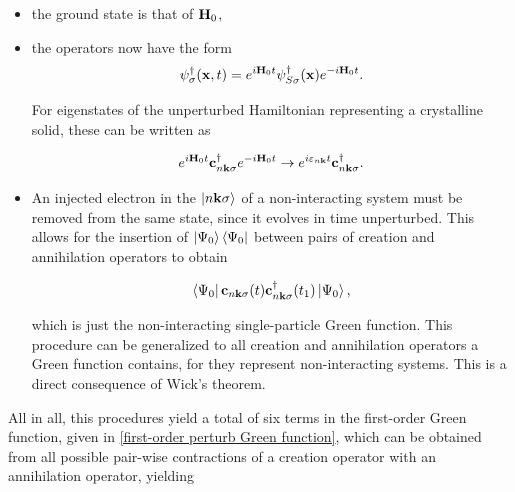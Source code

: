 \documentclass{homework}
\begin{document}
\begin{itemize}
    \item the ground state is that of ${\bf H}_0$, 
    \item the operators now have the form
          $$
            \psi_\sigma^\dagger({\bf x},t) = e^{i {\bf H}_0 t} \psi_{S \sigma}^\dagger({\bf x}) e^{-i {\bf H}_0 t}.
          $$
          
          For eigenstates of the unperturbed Hamiltonian representing a crystalline solid, these can be written as 
          
           $$
            e^{i {\bf H}_0 t} {\bf c}_{n {\bf k} \sigma}^\dagger e^{-i {\bf H}_0 t} \rightarrow e^{i \varepsilon_{n {\bf k}} t}{\bf c}_{n {\bf k} \sigma}^\dagger.
          $$
          
    \item An injected electron in the $\ket{n {\bf k} \sigma}$ of a non-interacting system must be removed from the same state, since it evolves in time unperturbed. This allows for the insertion of $\ket{\Psi_0}\bra{\Psi_0}$ between pairs of creation and annihilation operators to obtain
    
    $$
        \bra{\Psi_0} {{\bf c}}_{n {{\bf k}} \sigma}(t) {{\bf c}}_{n {{\bf k}} \sigma}^\dagger(t_1) \ket{\Psi_0},
    $$
    
    which is just the non-interacting single-particle Green function. This procedure can be generalized to all creation and annihilation operators a Green function contains, for they represent non-interacting systems. This is a direct consequence of Wick's theorem. 
    
\end{itemize}

All in all, this procedures yield a total of six terms in the first-order Green function, given in \cref{first-order perturb Green function}, which can be obtained from all possible pair-wise contractions of a creation operator with an annihilation operator, yielding 
\end{document}
